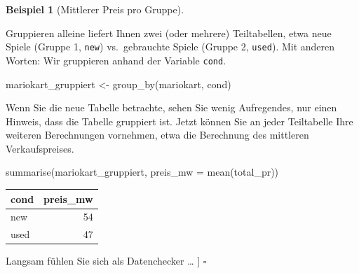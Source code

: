 \documentclass[
  letterpaper,
]{scrbook}
\newenvironment{Shaded}{\begin{snugshade}}{\end{snugshade}}
\newcommand{\AttributeTok}[1]{\textcolor[rgb]{0.40,0.45,0.13}{#1}}
\newcommand{\FunctionTok}[1]{\textcolor[rgb]{0.28,0.35,0.67}{#1}}
\newcommand{\NormalTok}[1]{\textcolor[rgb]{0.00,0.23,0.31}{#1}}
\newcommand{\OtherTok}[1]{\textcolor[rgb]{0.00,0.23,0.31}{#1}}
\theoremstyle{definition}
\newtheorem{example}{Beispiel}[chapter]
\theoremstyle{definition}
\theoremstyle{definition}
\theoremstyle{remark}
\begin{document}
\begin{example}[Mittlerer Preis pro
Gruppe]\protect\hypertarget{exm-groupby}{}\label{exm-groupby}

Gruppieren alleine liefert Ihnen zwei (oder mehrere) Teiltabellen, etwa
neue Spiele (Gruppe 1, \texttt{new}) vs.~gebrauchte Spiele (Gruppe 2,
\texttt{used}). Mit anderen Worten: Wir gruppieren anhand der Variable
\texttt{cond}.

\begin{Shaded}
\begin{Highlighting}[]
\NormalTok{mariokart\_gruppiert }\OtherTok{\textless{}{-}} \FunctionTok{group\_by}\NormalTok{(mariokart, cond)}
\end{Highlighting}
\end{Shaded}

Wenn Sie die neue Tabelle betrachte, sehen Sie wenig Aufregendes, nur
einen Hinweis, dass die Tabelle gruppiert ist. Jetzt können Sie an jeder
Teiltabelle Ihre weiteren Berechnungen vornehmen, etwa die Berechnung
des mittleren Verkaufspreises.

\begin{Shaded}
\begin{Highlighting}[]
\FunctionTok{summarise}\NormalTok{(mariokart\_gruppiert, }\AttributeTok{preis\_mw =} \FunctionTok{mean}\NormalTok{(total\_pr))}
\end{Highlighting}
\end{Shaded}

\begin{longtable}[]{@{}lr@{}}
\toprule\noalign{}
cond & preis\_mw \\
\midrule\noalign{}
\endhead
\bottomrule\noalign{}
\endlastfoot
new & 54 \\
used & 47 \\
\end{longtable}

Langsam fühlen Sie sich als Datenchecker \ldots{} {]} \(\square\)

\end{example}
\end{document}

